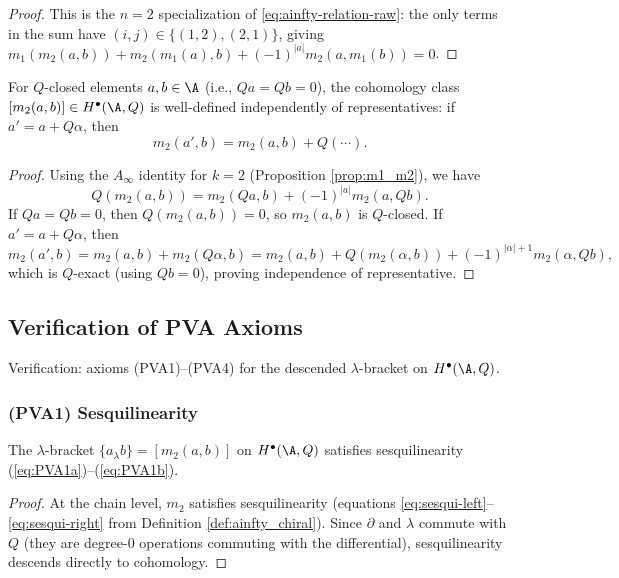\begin{proof}
This is the $n=2$ specialization of \eqref{eq:ainfty-relation-raw}: the only terms in the sum have $(i,j)\in\{(1,2),(2,1)\}$, giving $m_1(m_2(a,b)) + m_2(m_1(a),b) + (-1)^{|a|}m_2(a,m_1(b))=0$.
\end{proof}

\begin{lemma}
For $Q$-closed elements $a,b \in \A$ (i.e., $Qa = Qb = 0$), the cohomology class $[m_2(a,b)] \in H^\bullet(\A,Q)$ is well-defined independently of representatives: if $a' = a + Q\alpha$, then
\[
m_2(a',b) = m_2(a,b) + Q(\cdots).
\]
\end{lemma}

\begin{proof}
Using the $A_\infty$ identity for $k=2$ (Proposition \ref{prop:m1_m2}), we have
\[
Q(m_2(a,b)) = m_2(Qa,b) + (-1)^{|a|} m_2(a,Qb).
\]
If $Qa = Qb = 0$, then $Q(m_2(a,b)) = 0$, so $m_2(a,b)$ is $Q$-closed. If $a' = a + Q\alpha$, then
\[
m_2(a',b) = m_2(a,b) + m_2(Q\alpha,b) = m_2(a,b) + Q(m_2(\alpha,b)) + (-1)^{|\alpha|+1} m_2(\alpha,Qb),
\]
which is $Q$-exact (using $Qb=0$), proving independence of representative.
\end{proof}

\subsection{Verification of PVA Axioms}

Verification: axioms (PVA1)--(PVA4) for the descended $\lambda$-bracket on $H^\bullet(\A,Q)$.

\subsubsection{(PVA1) Sesquilinearity}

\begin{proposition}
The $\lambda$-bracket $\{a_\lambda b\} = [m_2(a,b)]$ on $H^\bullet(\A,Q)$ satisfies sesquilinearity (\ref{eq:PVA1a})--(\ref{eq:PVA1b}).
\end{proposition}

\begin{proof}
At the chain level, $m_2$ satisfies sesquilinearity (equations \ref{eq:sesqui-left}--\ref{eq:sesqui-right} from Definition \ref{def:ainfty_chiral}). Since $\partial$ and $\lambda$ commute with $Q$ (they are degree-0 operations commuting with the differential), sesquilinearity descends directly to cohomology.
\end{proof}

